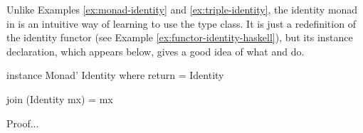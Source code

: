 
\begin{example}
  \label{ex:monad-identity-haskell}

  Unlike Examples \ref{ex:monad-identity} and
  \ref{ex:triple-identity}, the identity monad in \hask is an
  intuitive way of learning to use the  type
  class. It is just a redefinition of the identity functor (see
  Example \ref{ex:functor-identity-haskell}), but its instance
  declaration, which appears below, gives a good idea of what
   and  do.

  \begin{codehaskell}
instance Monad' Identity where
  return = Identity

  join (Identity mx) = mx
  \end{codehaskell}

  Proof...

\end{example}

